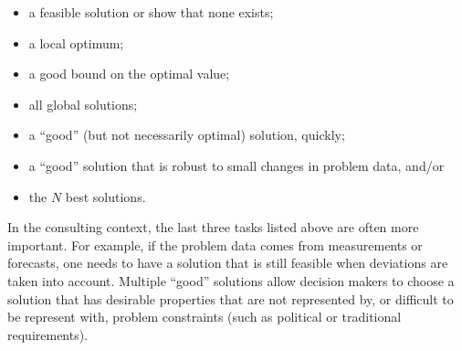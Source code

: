 \begin{itemize}[noitemsep]
\item
  a feasible solution or show that none exists;
\item
  a local optimum;
\item
  a good bound on the optimal value;
\item
  all global solutions;
\item
  a ``good'' (but not necessarily optimal) solution, quickly;
\item
  a ``good'' solution that is robust to small changes in problem data, and/or
\item
  the \(N\) best solutions.
\end{itemize}
In the consulting context, the last three tasks listed above are often more important. For
example, if the problem data comes from measurements or forecasts, one needs
to have a solution that is still feasible when deviations are taken into
account. Multiple ``good'' solutions allow decision makers to choose a
solution that has desirable properties that are not represented by, or
difficult to be represent with, problem constraints (such as political or traditional requirements).
